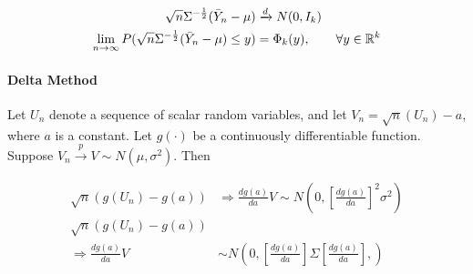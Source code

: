 \begin{align*}
	\sqrt{n} \Sigma^{-\frac{1}{2}}(\bar{Y}_n- \mu) &\xrightarrow[]{%
		\substack{d}
	} N(0,I_k) \\
	\lim\limits_{n \rightarrow \infty} P (\sqrt{n}\Sigma^{-\frac{1}{2}}(\bar{Y}_n - \mu) \leq y) &= \Phi_k(y), \qquad \forall y \in \mathbb{R}^k
\end{align*}

\paragraph{Delta Method}

Let $U_n$ denote a sequence of scalar random variables, and let $V_n = \sqrt{n}(U_n)-a$, where $a$ is a constant.
Let $g(\cdot)$ be a continuously differentiable function. Suppose $V_n \stackrel{p}{\longrightarrow} V \sim N(\mu, \sigma^2)$. Then

\begin{align*}
    \sqrt{n}\left(g\left(U_n\right)-g(a)\right) &\Rightarrow \frac{d g(a)}{d a} V \sim N \left(0,\left[\frac{d g(a)}{d a}\right]^2 \sigma^2\right) \\
	\sqrt{n}\left(g\left(U_n\right)-g(a)\right) & \\
	\Rightarrow \frac{d g(a)}{d a} V &\sim N \left(0,\left[\frac{d g(a)}{d a}\right] \Sigma\left[\frac{d g(a)}{d a}\right],\right)
\end{align*}